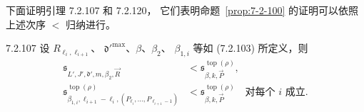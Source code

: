 下面证明引理 7.2.107 和 7.2.120，
它们表明命题~\ref{prop:7-2-100}
的证明可以依照上述次序 $<$ 归纳进行。

\begin{lemma}{7.2.107}\label{lem:7-2-107}
设 $R_{\ell_i,\ell_{i+1}}$、
$\mathfrak d'^{\max}$、$\beta$、$\beta_2$、
$\beta_{1,i}$ 等如 (7.2.103) 所定义，则
\begin{align}
\mathfrak s_{L',J',\mathfrak d',m,\beta_2,\vec R}
&<\mathfrak s^{\operatorname{top}(\rho)}_{\beta,k,\vec P},
\tag{7.2.108.1}\label{eq:7-2-108-1}\\
\mathfrak s^{\operatorname{top}(\rho)}_{\beta_{1,i},
\ell_{i+1}-\ell_i,
(P_{\ell_i},\ldots,P_{\ell_{i+1}-1})}
&<\mathfrak s^{\operatorname{top}(\rho)}_{\beta,k,\vec P}
\quad\text{对每个 $i$ 成立}.
\tag{7.2.108.2}\label{eq:7-2-108-2}
\end{align}
\end{lemma}

